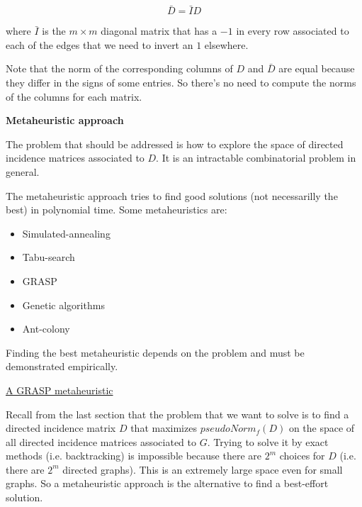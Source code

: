 \documentclass[a4paper,11pt]{article}
\begin{document}
$$\bar{D} = \bar{I} D$$

\bigskip

where $\bar{I}$ is the $m \times m$ diagonal matrix that has a $-1$ in 
every row associated to each of the edges that we need to invert an $1$ 
elsewhere.

\bigskip


Note that the norm of the corresponding columns of $D$ and $\bar{D}$ are  
equal because they differ in the signs of some entries. So there's no 
need to compute the norms of the columns for each matrix. 

\bigskip

\textbf{Metaheuristic approach}

\bigskip

The problem that should be addressed is how to explore the space of 
directed incidence matrices associated to $D$. It is an intractable 
combinatorial problem in general. 

\bigskip

The metaheuristic approach tries to find good solutions (not 
necessarilly the best) in polynomial time. Some metaheuristics are:

\begin{itemize}
	\item Simulated-annealing
	\item Tabu-search
	\item GRASP
	\item Genetic algorithms
	\item Ant-colony
\end{itemize}

Finding the best metaheuristic depends on the problem and must be 
demonstrated empirically.

\bigskip

\underline{A GRASP metaheuristic}

\bigskip

Recall from the last section that the problem that we want to solve is 
to find a directed incidence matrix $D$ that maximizes $pseudoNorm_f(D)$ 
on the space of all directed incidence matrices associated to $G$. 
Trying to solve it by exact methods (i.e. backtracking) is impossible 
because there are $2^m$ choices for $D$ (i.e. there are $2^m$ directed 
graphs). This is an extremely large space even for small graphs. So a 
metaheuristic approach is the alternative to find a best-effort 
solution.

\bigskip
\end{document}
